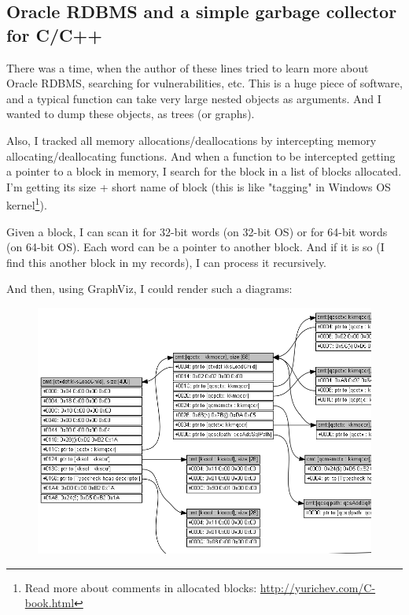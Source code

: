 \subsection{Oracle RDBMS and a simple garbage collector for C/C++}

There was a time, when the author of these lines tried to learn more about Oracle RDBMS, searching for vulnerabilities, etc.
This is a huge piece of software, and a typical function can take very large nested objects as arguments.
And I wanted to dump these objects, as trees (or graphs).

Also, I tracked all memory allocations/deallocations by intercepting memory allocating/deallocating functions.
And when a function to be intercepted getting a pointer to a block in memory, I search for the block in a list of blocks allocated.
I'm getting its size + short name of block
(this is like "tagging" in Windows OS kernel\footnote{Read more about comments in allocated blocks: \CNotes{} \url{http://yurichev.com/C-book.html}}).

Given a block, I can scan it for 32-bit words (on 32-bit OS) or for 64-bit words (on 64-bit OS).
Each word can be a pointer to another block.
And if it is so (I find this another block in my records), I can process it recursively.

And then, using GraphViz, I could render such a diagrams:

\begin{figure}[H]
\centering
\includegraphics[scale=0.55]{advanced/450_more_ptrs/oracle2_crop.png}
\end{figure}

